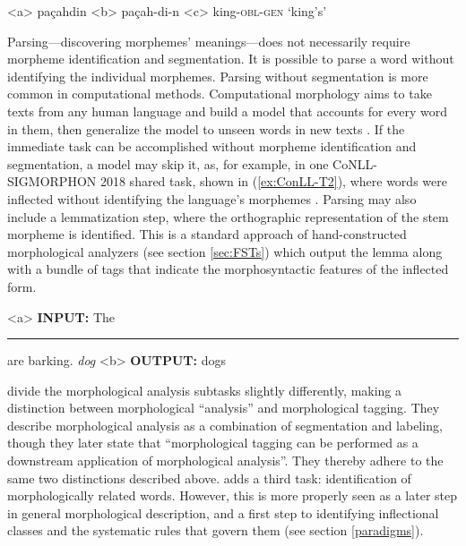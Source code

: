 \documentclass[12pt]{article}
\begin{document}
\begin{singlespace}

\label{ex:Lezgi1}
\a<a> pa\c{c}ahdin 
\label{ex:Lezgi1a}
\a<b> pa\c{c}ah-di-n 
\label{ex:Lezgi1b}
\a<c> king-\textsc{obl}-\textsc{gen} 
\label{ex:Lezgi1c}
\a `king's'
\label{ex:Lezgi1d}
\xe

\end{singlespace}

Parsing---discovering morphemes' meanings---does not necessarily require morpheme identification and segmentation. It is possible to parse a word without identifying the individual morphemes. Parsing without segmentation is more common in computational methods. Computational morphology aims to take texts from any human language and build a model that accounts for every word in them, then generalize the model to unseen words in new texts \cite{goldsmith_computational_2017}. If the immediate task can be accomplished without morpheme identification and segmentation, a model may skip it, as, for example, in one CoNLL-SIGMORPHON 2018 shared task, shown in (\ref{ex:ConLL-T2}), where words were inflected without identifying the language's morphemes \cite{cotterell_conllsigmorphon_2018}. Parsing may also include a lemmatization step, where the orthographic representation of the stem morpheme is identified. This is a standard approach of hand-constructed morphological analyzers (see section \ref{sec:FSTs}) which output the lemma along with a bundle of tags that indicate the morphosyntactic features of the inflected form. 

\begin{singlespace}
\label{ex:ConLL-T2}
\a<a> \textbf{INPUT:}  The \rule{1cm}{0.15mm} are barking.  \hspace{5 mm} \textit{dog}
\label{ex:ConLL-T2a}
\a<b> \textbf{OUTPUT:} dogs
\label{ex:ConLL-T2b}
\xe
\end{singlespace}

 divide the morphological analysis subtasks slightly differently, making a distinction between morphological “analysis” and morphological tagging. They describe morphological analysis as a combination of segmentation and labeling, though they later state that ``morphological tagging can be performed as a downstream application of morphological analysis''.
They thereby adhere to the same two distinctions described above.  adds a third task: identification of morphologically related words. However, this is more properly seen as a later step in general morphological description, and a first step to identifying inflectional classes and the systematic rules that govern them (see section \ref{paradigms}).
\end{document}
